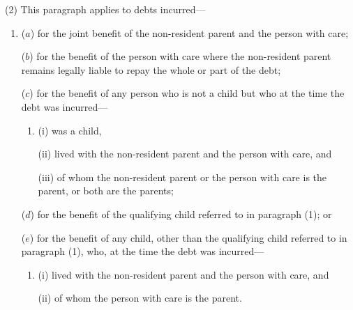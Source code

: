 \documentclass[12pt,a4paper]{article}
\begin{document}
(2) This paragraph applies to debts incurred—
\begin{enumerate}\item[]
($a$) for the joint benefit of the non-resident parent and the person with care;

($b$) for the benefit of the person with care where the non-resident parent remains legally liable to repay the whole or part of the debt;

($c$) for the benefit of any person who is not a child but who at the time the debt was incurred—
\begin{enumerate}\item[]
(i) was a child,

(ii) lived with the non-resident parent and the person with care, and

(iii) of whom the non-resident parent or the person with care is the parent, or both are the parents;
\end{enumerate}

($d$) for the benefit of the qualifying child referred to in paragraph (1); or

($e$) for the benefit of any child, other than the qualifying child referred to in paragraph (1), who, at the time the debt was incurred—
\begin{enumerate}\item[]
(i) lived with the non-resident parent and the person with care, and

(ii) of whom the person with care is the parent.
\end{enumerate}
\end{enumerate}
\end{document}
